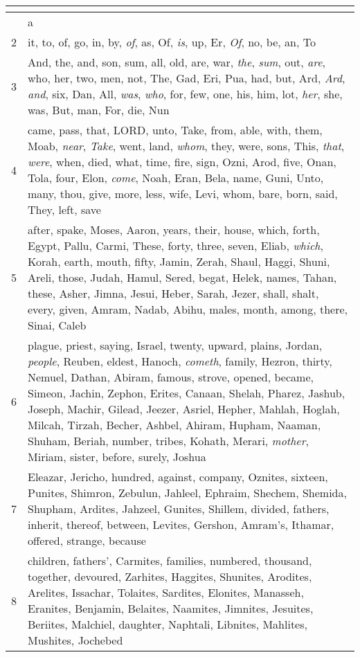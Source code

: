\begin{center}
\begin{longtable}{l|p{3.75in}}
\hline \multicolumn{2}{c}{{ }} \\ \hline
\endfoot 
1 & a\\ \hline 
2 & it, to, of, go, in, by, \emph{of}, as, Of, \emph{is}, up, Er, \emph{Of}, no, be, an, To\\ \hline 
3 & And, the, and, son, sum, all, old, are, war, \emph{the}, \emph{sum}, out, \emph{are}, who, her, two, men, not, The, Gad, Eri, Pua, had, but, Ard, \emph{Ard}, \emph{and}, six, Dan, All, \emph{was}, \emph{who}, for, few, one, his, him, lot, \emph{her}, she, was, But, man, For, die, Nun\\ \hline 
4 & came, pass, that, LORD, unto, Take, from, able, with, them, Moab, \emph{near}, \emph{Take}, went, land, \emph{whom}, they, were, sons, This, \emph{that}, \emph{were}, when, died, what, time, fire, sign, Ozni, Arod, five, Onan, Tola, four, Elon, \emph{come}, Noah, Eran, Bela, name, Guni, Unto, many, thou, give, more, less, wife, Levi, whom, bare, born, said, They, left, save\\ \hline 
5 & after, spake, Moses, Aaron, years, their, house, which, forth, Egypt, Pallu, Carmi, These, forty, three, seven, Eliab, \emph{which}, Korah, earth, mouth, fifty, Jamin, Zerah, Shaul, Haggi, Shuni, Areli, those, Judah, Hamul, Sered, begat, Helek, names, Tahan, these, Asher, Jimna, Jesui, Heber, Sarah, Jezer, shall, shalt, every, given, Amram, Nadab, Abihu, males, month, among, there, Sinai, Caleb\\ \hline 
6 & plague, priest, saying, Israel, twenty, upward, plains, Jordan, \emph{people}, Reuben, eldest, Hanoch, \emph{cometh}, family, Hezron, thirty, Nemuel, Dathan, Abiram, famous, strove, opened, became, Simeon, Jachin, Zephon, Erites, Canaan, Shelah, Pharez, Jashub, Joseph, Machir, Gilead, Jeezer, Asriel, Hepher, Mahlah, Hoglah, Milcah, Tirzah, Becher, Ashbel, Ahiram, Hupham, Naaman, Shuham, Beriah, number, tribes, Kohath, Merari, \emph{mother}, Miriam, sister, before, surely, Joshua\\ \hline 
7 & Eleazar, Jericho, hundred, against, company, Oznites, sixteen, Punites, Shimron, Zebulun, Jahleel, Ephraim, Shechem, Shemida, Shupham, Ardites, Jahzeel, Gunites, Shillem, divided, fathers, inherit, thereof, between, Levites, Gershon, Amram's, Ithamar, offered, strange, because\\ \hline 
8 & children, fathers', Carmites, families, numbered, thousand, together, devoured, Zarhites, Haggites, Shunites, Arodites, Arelites, Issachar, Tolaites, Sardites, Elonites, Manasseh, Eranites, Benjamin, Belaites, Naamites, Jimnites, Jesuites, Beriites, Malchiel, daughter, Naphtali, Libnites, Mahlites, Mushites, Jochebed\\ \hline 

\end{longtable}
\end{center}
